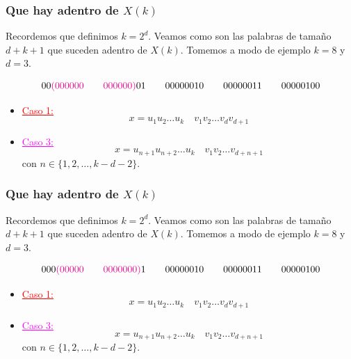 \documentclass[10pt,mathserif]{beamer}%
\begin{document}
\begin{frame}
  \frametitle{Que hay adentro de $X(k)$}
  Recordemos que definimos $k = 2^d$.
  Veamos como son las palabras de tamaño $d + k + 1$ que suceden adentro de $X(k)$. Tomemos a modo de ejemplo $k = 8$ y $d = 3$.

  $$00\textcolor{magenta}{(000000 \qquad 000000)} 01 \qquad 00000010 \qquad 00000011 \qquad 00000100$$

    \begin{itemize}
    \item \textcolor{red}{\underline{Caso 1:}}
    $$x = u_1 u_2 \dots u_k \quad v_1 v_2 \dots v_{d} v_{d + 1}$$  
    \par
    \item \textcolor{magenta}{\underline{Caso 3:}}
    $$x = u_{n+1} u_{n+2} \dots u_k \quad  v_1 v_2 \dots v_{d+n+1} $$
    con $n \in \{1,2,\dots ,k - d - 2\}$.
    \par
  \end{itemize}
\end{frame}

\begin{frame}
  \frametitle{Que hay adentro de $X(k)$}
  Recordemos que definimos $k = 2^d$.
  Veamos como son las palabras de tamaño $d + k + 1$ que suceden adentro de $X(k)$. Tomemos a modo de ejemplo $k = 8$ y $d = 3$.

  $$000\textcolor{magenta}{(00000 \qquad 0000000)} 1 \qquad 00000010 \qquad 00000011 \qquad 00000100$$

    \begin{itemize}
    \item \textcolor{red}{\underline{Caso 1:}}
    $$x = u_1 u_2 \dots u_k \quad v_1 v_2 \dots v_{d} v_{d + 1}$$  
    \par
    \item \textcolor{magenta}{\underline{Caso 3:}}
    $$x = u_{n+1} u_{n+2} \dots u_k \quad  v_1 v_2 \dots v_{d+n+1} $$
    con $n \in \{1,2,\dots ,k - d - 2\}$.
    \par
  \end{itemize}
\end{frame}
\end{document}
